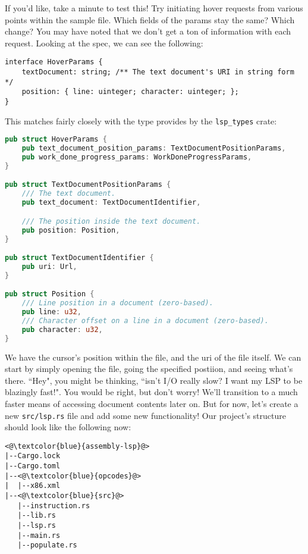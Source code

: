 If you'd like, take a minute to test this! Try initiating hover requests from various points within the sample file. Which fields of the params stay the same? Which change? You may have noted that we don't get a ton of information with each request. Looking at the spec, we can see the following:

\begin{lstlisting}
interface HoverParams {
	textDocument: string; /** The text document's URI in string form */
	position: { line: uinteger; character: uinteger; };
}
\end{lstlisting}

This matches fairly closely with the type provides by the \texttt{lsp\_types} crate:

\begin{lstlisting}[language=rust]
pub struct HoverParams {
    pub text_document_position_params: TextDocumentPositionParams,
    pub work_done_progress_params: WorkDoneProgressParams,
}

pub struct TextDocumentPositionParams {
    /// The text document.
    pub text_document: TextDocumentIdentifier,

    /// The position inside the text document.
    pub position: Position,
}

pub struct TextDocumentIdentifier {
    pub uri: Url,
}

pub struct Position {
    /// Line position in a document (zero-based).
    pub line: u32,
    /// Character offset on a line in a document (zero-based).
    pub character: u32,
}
\end{lstlisting}

We have the cursor's position within the file, and the uri of the file itself. We can start by simply opening the file, going the specified postiion, and seeing what's there. ``Hey", you might be thinking, ``isn't I/O really slow? I want my LSP to be blazingly fast!". You would be right, but don't worry! We'll transition to a much faster means of accessing document contents later on. But for now, let's create a new \texttt{src/lsp.rs} file and add some new functionality! Our project's structure should look like the following now:

\begin{lstlisting}
<@\textcolor{blue}{assembly-lsp}@>
|--Cargo.lock
|--Cargo.toml
|--<@\textcolor{blue}{opcodes}@>
|  |--x86.xml
|--<@\textcolor{blue}{src}@>
   |--instruction.rs
   |--lib.rs
   |--lsp.rs
   |--main.rs
   |--populate.rs
\end{lstlisting}

